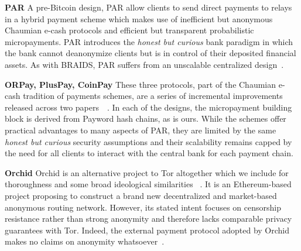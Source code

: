 \textbf{PAR} A pre-Bitcoin design, PAR allow clients to send direct payments to
relays in a hybrid payment scheme which makes use of inefficient but anonymous
Chaumian e-cash protocols and efficient but transparent probabilistic
micropayments. PAR introduces the \emph{honest but curious} bank paradigm in
which the bank cannot deanonymize clients but is in control of their deposited
financial assets. As with BRAIDS, PAR suffers from an unscalable centralized
design~\cite{androulaki2008payment}.

\textbf{ORPay, PlusPay, CoinPay} These three protocols, part of the Chaumian
e-cash tradition of payments schemes, are a series of incremental improvements
released across two papers~\cite{chen2009xpay}~\cite{carbunar2012tipping}. In
each of the designs, the micropayment building block is derived from Payword
hash chains, as is ours. While the schemes offer practical advantages to many
aspects of PAR, they are limited by the same \emph{honest but curious} security
assumptions and their scalability remains capped by the need for all clients to
interact with the central bank for each payment chain.

\textbf{Orchid} Orchid is an alternative project to Tor altogether which we
include for thoroughness and some broad ideological similarities
~\cite{salamon2018orchid}. It is an Ethereum-based project proposing to
construct a brand new decentralized and market-based anonymous routing
network. However, its stated intent focuses on censorship resistance rather
than strong anonymity and therefore lacks comparable privacy guarantees with
Tor. Indeed, the external payment protocol adopted by Orchid makes no claims on
anonymity whatsoever~\cite{pass2015micropayments}.
